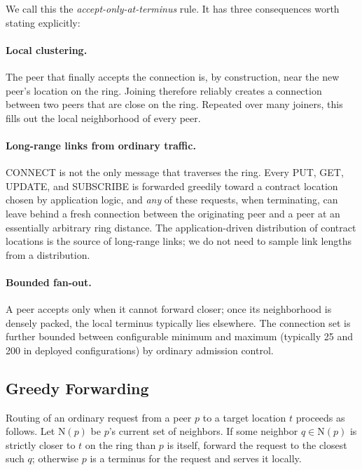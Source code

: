 We call this the \emph{accept-only-at-terminus} rule. It has three consequences worth stating explicitly:

\paragraph{Local clustering.} The peer that finally accepts the connection is, by construction, near the new peer's location on the ring. Joining therefore reliably creates a connection between two peers that are close on the ring. Repeated over many joiners, this fills out the local neighborhood of every peer.

\paragraph{Long-range links from ordinary traffic.} \textsf{CONNECT} is not the only message that traverses the ring. Every \textsf{PUT}, \textsf{GET}, \textsf{UPDATE}, and \textsf{SUBSCRIBE} is forwarded greedily toward a contract location chosen by application logic, and \emph{any} of these requests, when terminating, can leave behind a fresh connection between the originating peer and a peer at an essentially arbitrary ring distance. The application-driven distribution of contract locations is the source of long-range links; we do not need to sample link lengths from a distribution.

\paragraph{Bounded fan-out.} A peer accepts only when it cannot forward closer; once its neighborhood is densely packed, the local terminus typically lies elsewhere. The connection set is further bounded between configurable minimum and maximum (typically 25 and 200 in deployed configurations) by ordinary admission control.

\subsection{Greedy Forwarding}

Routing of an ordinary request from a peer $p$ to a target location $t$ proceeds as follows. Let $\mathrm{N}(p)$ be $p$'s current set of neighbors. If some neighbor $q \in \mathrm{N}(p)$ is strictly closer to $t$ on the ring than $p$ is itself, forward the request to the closest such $q$; otherwise $p$ is a terminus for the request and serves it locally.

